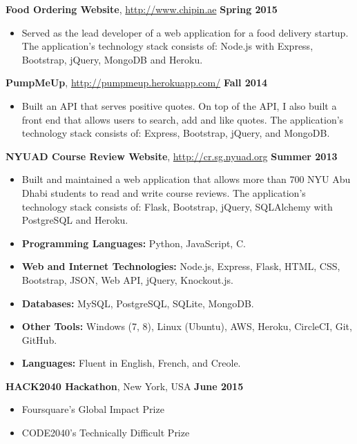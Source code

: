 \documentclass[11pt]{article} %
\begin{document}
\noindent \centerline{\normalsize \textbf{Food Ordering Website}, \url{http://www.chipin.ae} \hfill \textbf{Spring 2015}}
\begin{itemize}
  \item Served as the lead developer of a web application for a food delivery startup. The application's technology stack consists of: Node.js with Express, Bootstrap, jQuery, MongoDB and Heroku.
\end{itemize}
\noindent \centerline{\normalsize \textbf{PumpMeUp}, \url{http://pumpmeup.herokuapp.com/} \hfill \textbf{Fall 2014}}
\begin{itemize}\itemsep-0.2em
  \item Built an API that serves positive quotes. On top of the API, I also built a front end that allows users to search, add and like quotes. The application's technology stack consists of: Express, Bootstrap, jQuery, and MongoDB.
\end{itemize}
\noindent \centerline{\normalsize \textbf{NYUAD Course Review Website}, \url{http://cr.sg.nyuad.org} \hfill \textbf{Summer 2013}}
\begin{itemize}\itemsep-0.2em
  \item Built and maintained a web application that allows more than 700 NYU Abu Dhabi students to read and write course reviews. The application's technology stack consists of: Flask, Bootstrap, jQuery, SQLAlchemy with PostgreSQL and Heroku.
\end{itemize}
\medskip

\begin{itemize}\itemsep-0.2em
  \item \textbf{Programming Languages:} Python, JavaScript, C.
  \item \textbf{Web and Internet Technologies:} Node.js, Express, Flask, HTML, CSS, Bootstrap, JSON, Web API, jQuery, Knockout.js.
  \item \textbf{Databases:} MySQL, PostgreSQL, SQLite, MongoDB.
  \item \textbf{Other Tools:} Windows (7, 8), Linux (Ubuntu), AWS, Heroku, CircleCI, Git, GitHub.
  \item \textbf{Languages:} Fluent in English, French, and Creole.
\end{itemize}
\medskip

 \medskip

\noindent \centerline{\normalsize  \textbf {HACK2040 Hackathon}, New York, USA \hfill \textbf{June 2015}}
\begin{itemize}\itemsep-0.2em
  \item Foursquare's Global Impact Prize
  \item CODE2040's Technically Difficult Prize
\end{itemize}
\end{document}
